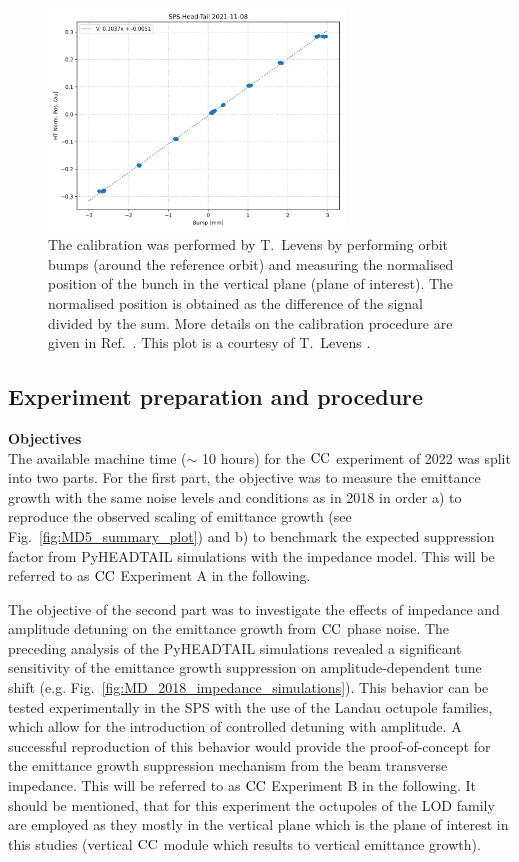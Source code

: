 \begin{figure}[!h] %
    \centering         
    \includegraphics[width=0.7\textwidth]{images/Ch8/HT_monitor_calibration_2022.png}
        \caption{The calibration was performed by T.~Levens by performing orbit bumps (around the reference orbit) and measuring the normalised position of the bunch in the vertical plane (plane of interest). The normalised position is obtained as the difference of the signal divided by the sum. More details on the calibration procedure are given in Ref.~\cite{PhysRevAccelBeams.22.112803}. This plot is a courtesy of T.~Levens .}
        \label{fig:HT_calibration_2022_levens}
 \end{figure}


\subsection{Experiment preparation and procedure}\label{sec:cc_md_2022_preparation}
\textbf{Objectives}\\
The available machine time ($\sim$ 10 hours) for the ${\mathrm{CC}}$ experiment of 2022 was split into two parts. For the first part, the objective was to measure the emittance growth with the same noise levels and conditions as in 2018 in order a) to reproduce the observed scaling of emittance growth (see Fig.~\ref{fig:MD5_summary_plot}) and b) to benchmark the expected suppression factor from PyHEADTAIL simulations with the impedance model. This will be referred to as ${\mathrm{CC}}$ Experiment A in the following.

The objective of the second part was to investigate the effects of impedance and amplitude detuning on the emittance growth from ${\mathrm{CC}}$ phase noise. The preceding analysis of the PyHEADTAIL simulations revealed a significant sensitivity of the emittance growth suppression on amplitude-dependent tune shift (e.g. Fig.~\ref{fig:MD_2018_impedance_simulations}). This behavior can be tested experimentally in the SPS with the use of the Landau octupole families, which allow for the introduction of controlled detuning with amplitude. A successful reproduction of this behavior would provide the proof-of-concept for the emittance growth suppression mechanism from the beam transverse impedance. This will be referred to as ${\mathrm{CC}}$ Experiment B in the following. It should be mentioned, that for this experiment the octupoles of the LOD family are employed as they mostly in the vertical plane which is the plane of interest in this studies (vertical ${\mathrm{CC}}$ module which results to vertical emittance growth).

